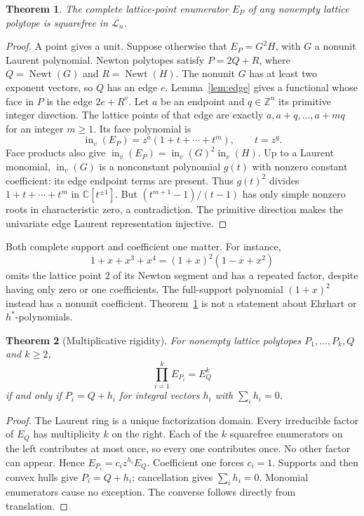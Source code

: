 \documentclass[11pt]{article}
\newtheorem{theorem}{Theorem}[section]
\newcommand{\Z}{\mathbb Z}\newcommand{\R}{\mathbb R}\newcommand{\C}{\mathbb C}
\DeclareMathOperator{\Newt}{Newt}\DeclareMathOperator{\conv}{conv}
\begin{document}
\begin{theorem}\label{thm:sf}
The complete lattice-point enumerator \(E_P\) of any nonempty lattice polytope is squarefree in \(\mathcal L_n\).
\end{theorem}
\begin{proof}
A point gives a unit. Suppose otherwise that \(E_P=G^2H\), with \(G\) a nonunit Laurent polynomial. Newton polytopes satisfy
\(P=2Q+R\), where \(Q=\Newt(G)\) and \(R=\Newt(H)\).
The nonunit \(G\) has at least two exponent vectors, so \(Q\) has an edge \(e\).
Lemma~\ref{lem:edge} gives a functional whose face in \(P\) is the edge \(2e+R^v\).
Let \(a\) be an endpoint and \(q\in\Z^n\) its primitive integer direction. The lattice points of that edge are exactly \(a,a+q,\ldots,a+mq\) for an integer \(m\ge1\). Its face polynomial is
\[
\operatorname{in}_v(E_P)=z^a(1+t+\cdots+t^m),\qquad t=z^q.
\]
Face products also give
\(\operatorname{in}_v(E_P)=\operatorname{in}_v(G)^2\operatorname{in}_v(H)\).
Up to a Laurent monomial, \(\operatorname{in}_v(G)\) is a nonconstant polynomial \(g(t)\) with nonzero constant coefficient: its edge endpoint terms are present. Thus \(g(t)^2\) divides \(1+t+\cdots+t^m\) in \(\C[t^{\pm1}]\).
But \((t^{m+1}-1)/(t-1)\) has only simple nonzero roots in characteristic zero, a contradiction. The primitive direction makes the univariate edge Laurent representation injective.
\end{proof}

Both complete support and coefficient one matter. For instance,
\[
1+x+x^3+x^4=(1+x)^2(1-x+x^2)
\]
omits the lattice point \(2\) of its Newton segment and has a repeated factor, despite having only zero or one coefficients. The full-support polynomial \((1+x)^2\) instead has a nonunit coefficient. Theorem~\ref{thm:sf} is not a statement about Ehrhart or \(h^*\)-polynomials.

\begin{theorem}[Multiplicative rigidity]\label{thm:mult}
For nonempty lattice polytopes \(P_1,\ldots,P_k,Q\) and \(k\ge2\),
\[
\prod_{i=1}^kE_{P_i}=E_Q^k
\]
if and only if \(P_i=Q+h_i\) for integral vectors \(h_i\) with \(\sum_i h_i=0\).
\end{theorem}
\begin{proof}
The Laurent ring is a unique factorization domain. Every irreducible factor of \(E_Q\) has multiplicity \(k\) on the right. Each of the \(k\) squarefree enumerators on the left contributes at most once, so every one contributes once. No other factor can appear. Hence
\(E_{P_i}=c_i z^{h_i}E_Q\).
Coefficient one forces \(c_i=1\). Supports and then convex hulls give \(P_i=Q+h_i\); cancellation gives \(\sum_i h_i=0\). Monomial enumerators cause no exception. The converse follows directly from translation.
\end{proof}
\end{document}
